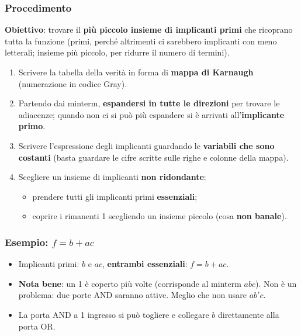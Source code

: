 \documentclass[12pt, a4paper]{article}
\begin{document}
\subsubsection{Procedimento}
\textbf{Obiettivo}: trovare il \textbf{più piccolo insieme di implicanti primi} che ricoprano tutta la funzione (primi, perché altrimenti ci sarebbero implicanti con meno letterali; insieme più piccolo, per ridurre il numero di termini).
\begin{enumerate}
    \item Scrivere la tabella della verità in forma di \textbf{mappa di Karnaugh} (numerazione in codice Gray).
    \item Partendo dai minterm, \textbf{espandersi in tutte le direzioni} per trovare le adiacenze; quando non ci si può più espandere si è arrivati all'\textbf{implicante primo}.
    \item Scrivere l'espressione degli implicanti guardando le \textbf{variabili che sono costanti} (basta guardare le cifre scritte sulle righe e colonne della mappa).
    \item Scegliere un insieme di implicanti \textbf{non ridondante}:
    \begin{itemize}
        \item prendere tutti gli implicanti primi \textbf{essenziali};
        \item coprire i rimanenti 1 scegliendo un insieme piccolo (cosa \textbf{non banale}).
    \end{itemize}
\end{enumerate}

\subsubsection{Esempio: \texorpdfstring{$f = b + ac$}{f = b + ac}}
\begin{itemize}
    \item Implicanti primi: $b$ e $ac$, \textbf{entrambi essenziali}: $f = b + ac$.
    \item \textbf{Nota bene}: un 1 è coperto più volte (corrisponde al minterm $abc$). Non è un problema: due porte AND saranno attive. Meglio che non usare $ab'c$.
    \item La porta AND a 1 ingresso si può togliere e collegare $b$ direttamente alla porta OR.
\end{itemize}
\end{document}
